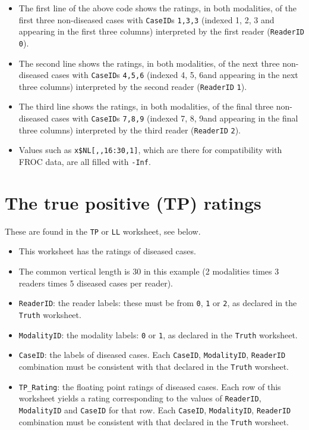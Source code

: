 \documentclass[]{book}
\providecommand{\tightlist}{%
  \setlength{\itemsep}{0pt}\setlength{\parskip}{0pt}}
\begin{document}
\begin{itemize}
\tightlist
\item
  The first line of the above code shows the ratings, in both modalities, of the first three non-diseased cases with \texttt{CaseID}s \texttt{1,3,3} (indexed 1, 2, 3 and appearing in the first three columns) interpreted by the first reader (\texttt{ReaderID} \texttt{0}).
\item
  The second line shows the ratings, in both modalities, of the next three non-diseased cases with \texttt{CaseID}s \texttt{4,5,6} (indexed 4, 5, 6and appearing in the next three columns) interpreted by the second reader (\texttt{ReaderID} \texttt{1}).
\item
  The third line shows the ratings, in both modalities, of the final three non-diseased cases with \texttt{CaseID}s \texttt{7,8,9} (indexed 7, 8, 9and appearing in the final three columns) interpreted by the third reader (\texttt{ReaderID} \texttt{2}).
\item
  Values such as \texttt{x\$NL{[},,16:30,1{]}}, which are there for compatibility with FROC data, are all filled with \texttt{-Inf}.
\end{itemize}

\hypertarget{the-true-positive-tp-ratings-3}{%
\section{The true positive (TP) ratings}\label{the-true-positive-tp-ratings-3}}

These are found in the \texttt{TP} or \texttt{LL} worksheet, see below.

\begin{itemize}
\tightlist
\item
  This worksheet has the ratings of diseased cases.
\item
  The common vertical length is 30 in this example (2 modalities times 3 readers times 5 diseased cases per reader).
\item
  \texttt{ReaderID}: the reader labels: these must be from \texttt{0}, \texttt{1} or \texttt{2}, as declared in the \texttt{Truth} worksheet.
\item
  \texttt{ModalityID}: the modality labels: \texttt{0} or \texttt{1}, as declared in the \texttt{Truth} worksheet.
\item
  \texttt{CaseID}: the labels of diseased cases. Each \texttt{CaseID}, \texttt{ModalityID}, \texttt{ReaderID} combination must be consistent with that declared in the \texttt{Truth} worsheet.\\
\item
  \texttt{TP\_Rating}: the floating point ratings of diseased cases. Each row of this worksheet yields a rating corresponding to the values of \texttt{ReaderID}, \texttt{ModalityID} and \texttt{CaseID} for that row. Each \texttt{CaseID}, \texttt{ModalityID}, \texttt{ReaderID} combination must be consistent with that declared in the \texttt{Truth} worsheet.
\end{itemize}
\end{document}
